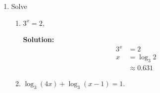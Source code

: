 \documentclass{report}
\newcommand{\sol}{\vspace{0.2cm}\textbf{Solution:}\vspace{0.2cm}}
\begin{document}
\begin{multicols*}{2}
\begin{enumerate}[leftmargin=*]
\begin{enumerate}
                  \item By using the substitution $y=e^{2 x}$, solve the equation $$ e^{2 x}+4 e^{-2
                                    x}=4 $$

                        \sol{}
                        \begin{align*}
                            e^{2x} + 4e^{-2x} & = 4                \\
                            y + \dfrac{4}{y}  & = 4                \\
                            y^2 + 4           & = 4y               \\
                            y^2 - 4y + 4      & = 0                \\
                            (y - 2)^2         & = 0                \\
                            y                 & = 2                \\
                            e^{2x}            & = 2                \\
                            2x                & = \ln 2            \\
                            x                 & = \dfrac{\ln 2}{2}
                        \end{align*}
              \end{enumerate}

        \item Solve
              \begin{enumerate}
                  \item $3^x=2$,

                        \sol{}
                        \begin{align*}
                            3^x & = 2           \\
                            x   & = \log_3 2    \\
                                & \approx 0.631
                        \end{align*}

                  \item $\log _3(4 x)+\log _3(x-1)=1$.


\end{enumerate}
\end{enumerate}
\end{multicols*}
\end{document}
